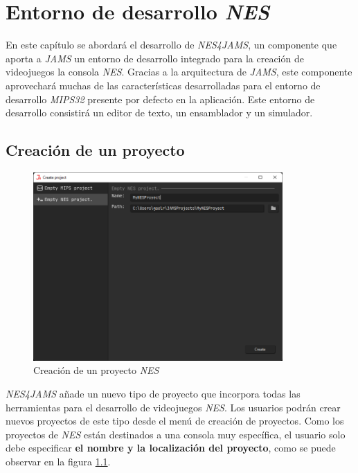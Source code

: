 \chapter{Entorno de desarrollo \textit{NES}}\label{ch:entorno-de-desarrollo-nes}

En este capítulo se abordará el desarrollo de \textit{NES4JAMS},
un componente que aporta a \textit{JAMS} un entorno de desarrollo
integrado para la creación de videojuegos  la consola
\textit{NES}.
Gracias a la arquitectura de \textit{JAMS}, este componente
aprovechará muchas de las características desarrolladas
para el entorno de desarrollo \textit{MIPS32} presente
por defecto en la aplicación.
Este entorno de desarrollo consistirá  un editor
de texto, un ensamblador y un simulador.


\section{Creación de un proyecto}\label{sec:creacion-de-un-proyecto}

\begin{figure}[h]
    \centering
    \includegraphics[width=0.85\textwidth]{images/nes/nes-project-creation}
    \caption{Creación de un proyecto \textit{NES}}
    \label{fig:nes-project-creation}
\end{figure}

\textit{NES4JAMS} añade  un nuevo tipo de proyecto
que incorpora todas las herramientas para el desarrollo
de videojuegos  \textit{NES}.
Los usuarios podrán crear nuevos proyectos de este tipo
desde el menú de creación de proyectos.
Como los proyectos de \textit{NES} están destinados
a una consola muy específica, el usuario solo debe
especificar \textbf{el nombre y la localización del proyecto},
como se puede observar en la figura \ref{fig:nes-project-creation}.

